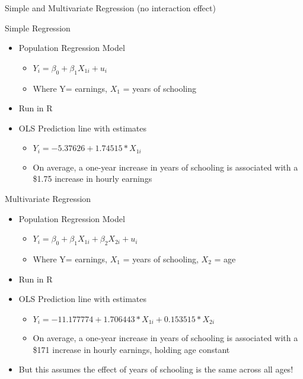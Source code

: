 \documentclass[8pt,ignorenonframetext,dvipsnames]{beamer}
\providecommand{\tightlist}{%
  \setlength{\itemsep}{0pt}\setlength{\parskip}{0pt}}
\let\olditem\item
\renewcommand{\item}{%
  \olditem\vspace{4pt}
}
\begin{document}
\begin{frame}{Simple and Multivariate Regression (no interaction
effect)}
\protect\hypertarget{simple-and-multivariate-regression-no-interaction-effect}{}

Simple Regression

\begin{itemize}
\tightlist
\item
  Population Regression Model

  \begin{itemize}
  \tightlist
  \item
    \(Y_i = \beta_0 + \beta_1X_{1i} + u_i\)
  \item
    Where Y= earnings, \(X_1\) = years of schooling
  \end{itemize}
\item
  Run in R
\item
  OLS Prediction line with estimates

  \begin{itemize}
  \tightlist
  \item
    \(Y_i = -5.37626 + 1.74515*X_{1i}\)
  \item
    On average, a one-year increase in years of schooling is associated
    with a \$1.75 increase in hourly earnings
  \end{itemize}
\end{itemize}

\medskip

Multivariate Regression

\begin{itemize}
\tightlist
\item
  Population Regression Model

  \begin{itemize}
  \tightlist
  \item
    \(Y_i = \beta_0 + \beta_1X_{1i} + \beta_2X_{2i} + u_i\)
  \item
    Where Y= earnings, \(X_1\) = years of schooling, \(X_2\) = age
  \end{itemize}
\item
  Run in R
\item
  OLS Prediction line with estimates

  \begin{itemize}
  \tightlist
  \item
    \(Y_i = -11.177774 + 1.706443*X_{1i} + 0.153515*X_{2i}\)
  \item
    On average, a one-year increase in years of schooling is associated
    with a \$171 increase in hourly earnings, holding age constant
  \end{itemize}
\item
  But this assumes the effect of years of schooling is the same across
  all ages!
\end{itemize}

\end{frame}
\end{document}
